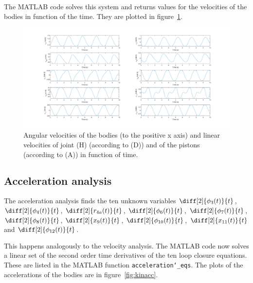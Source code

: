 \documentclass[a4paper]{article}
\begin{document}
The MATLAB code solves this system and returns values for the velocities of the bodies in function of the time. They are plotted in figure~\ref{fig:kinvel}.

\begin{figure}[h]
	\centering
	
	\includegraphics[width = \textwidth]{kinvel.png}
	
	\caption{Angular velocities of the bodies (to the positive x axis) and linear velocities of joint (H) (according to (D)) and of the pistons (according to (A)) in function of time.}
	\label{fig:kinvel}
	
\end{figure}

\newpage

\subsection{Acceleration analysis}

The acceleration analysis finds the ten unknown variables \(\diff[2]{\phi_3(t)}{t}\), \(\diff[2]{\phi_4(t)}{t}\), \(\diff[2]{r_{4a}(t)}{t}\), \(\diff[2]{\phi_6(t)}{t}\), \(\diff[2]{\phi_7(t)}{t}\), \(\diff[2]{\phi_8(t)}{t}\), \(\diff[2]{x_9(t)}{t}\), \(\diff[2]{\phi_{10}(t)}{t}\), \(\diff[2]{x_{11}(t)}{t}\) and \(\diff[2]{\phi_{12}(t)}{t}\).

This happens analogously to the velocity analysis. The MATLAB code now solves a linear set of the second order time derivatives of the ten loop closure equations. These are listed in the MATLAB function \texttt{acceleration\char`_eqs}. The plots of the accelerations of the bodies are in figure~\ref{fig:kinacc}.
\end{document}
